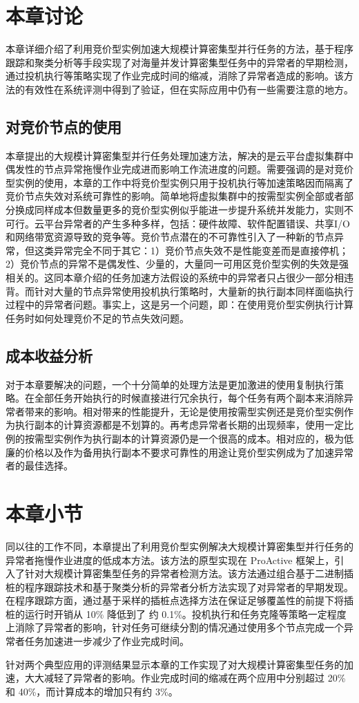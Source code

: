 \section{本章讨论}
本章详细介绍了利用竞价型实例加速大规模计算密集型并行任务的方法，基于程序跟踪和聚类分析等手段实现了对海量并发计算密集型任务中的异常者的早期检测，通过投机执行等策略实现了作业完成时间的缩减，消除了异常者造成的影响。该方法的有效性在系统评测中得到了验证，但在实际应用中仍有一些需要注意的地方。

\subsection{对竞价节点的使用}
本章提出的大规模计算密集型并行任务处理加速方法，解决的是云平台虚拟集群中偶发性的节点异常拖慢作业完成进而影响工作流进度的问题。需要强调的是对竞价型实例的使用，本章的工作中将竞价型实例只用于投机执行等加速策略因而隔离了竞价节点失效对系统可靠性的影响。简单地将虚拟集群中的按需型实例全部或者部分换成同样成本但数量更多的竞价型实例似乎能进一步提升系统并发能力，实则不可行。云平台异常者的产生多种多样，包括：硬件故障、软件配置错误、共享I/O和网络带宽资源导致的竞争等。竞价节点潜在的不可靠性引入了一种新的节点异常，但这类异常完全不同于其它：1）竞价节点失效不是性能变差而是直接停机；2）竞价节点的异常不是偶发性、少量的，大量同一可用区竞价型实例的失效是强相关的。这同本章介绍的任务加速方法假设的系统中的异常者只占很少一部分相违背。而针对大量的节点异常使用投机执行策略时，大量新的执行副本同样面临执行过程中的异常者问题。事实上，这是另一个问题，即：在使用竞价型实例执行计算任务时如何处理竞价不足的节点失效问题。

\subsection{成本收益分析}
对于本章要解决的问题，一个十分简单的处理方法是更加激进的使用复制执行策略。在全部任务开始执行的时候直接进行冗余执行，每个任务有两个副本来消除异常者带来的影响。相对带来的性能提升，无论是使用按需型实例还是竞价型实例作为执行副本的计算资源都是不划算的。再考虑异常者长期的出现频率，使用一定比例的按需型实例作为执行副本的计算资源仍是一个很高的成本。相对应的，极为低廉的价格以及作为备用执行副本不要求可靠性的用途让竞价型实例成为了加速异常者的最佳选择。

\section{本章小节}
同以往的工作不同，本章提出了利用竞价型实例解决大规模计算密集型并行任务的异常者拖慢作业进度的低成本方法。该方法的原型实现在 ProActive 框架上，引入了针对大规模计算密集型任务的异常者检测方法。该方法通过组合基于二进制插桩的程序跟踪技术和基于聚类分析的异常者分析方法实现了对异常者的早期发现。在程序跟踪方面，通过基于采样的插桩点选择方法在保证足够覆盖性的前提下将插桩的运行时开销从 10\% 降低到了 约 0.1\%。投机执行和任务克隆等策略一定程度上消除了异常者的影响，针对任务可继续分割的情况通过使用多个节点完成一个异常者任务加速进一步减少了作业完成时间。

针对两个典型应用的评测结果显示本章的工作实现了对大规模计算密集型任务的加速，大大减轻了异常者的影响。作业完成时间的缩减在两个应用中分别超过 20\% 和 40\%，而计算成本的增加只有约 3\%。